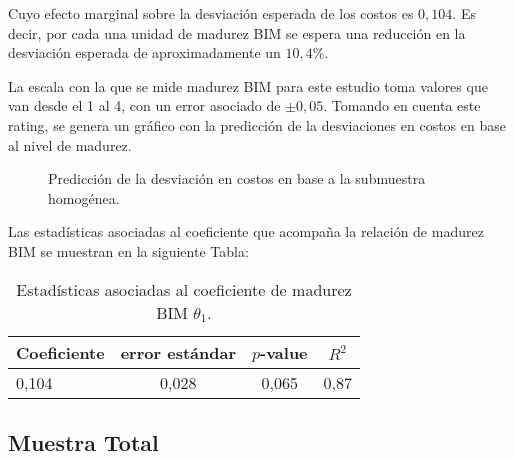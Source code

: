 Cuyo efecto marginal sobre la desviación esperada de los costos es $0,104$. Es decir, por cada una unidad de madurez BIM se espera una reducción en la desviación esperada de aproximadamente un $10,4\%$.

La escala con la que se mide madurez BIM para este estudio toma valores que van desde el 1 al 4, con un error asociado de $\pm 0,05$. Tomando en cuenta este rating, se genera un gráfico con la predicción de la desviaciones en costos en base al nivel de madurez.

\begin{figure}[H]
    \centering
    \caption{Predicción de la desviación en costos en base a la submuestra homogénea.}
\end{figure}

Las estadísticas asociadas al coeficiente que acompaña la relación de madurez BIM se muestran en la siguiente Tabla:

\begin{table}[H]
    \centering
    \label{tab.est}
    \caption{Estadísticas asociadas al coeficiente de madurez BIM $\theta_1$.}
    \begin{tabular}{lccc}
        \toprule
        Coeficiente & error estándar & $p$-value & $R^2$\\
        \midrule
        0,104 & 0,028 & 0,065 & 0,87\\  
        \bottomrule        
    \end{tabular}
\end{table}

\subsection{Muestra Total}

